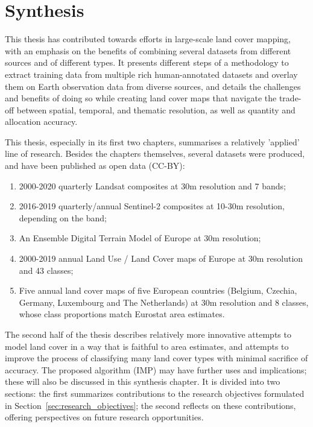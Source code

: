 \chapter[Synthesis]{Synthesis}
\label{cha:Chapter6}
\newpage

This thesis has contributed towards efforts in large-scale land cover mapping, with an emphasis on the benefits of combining several datasets from different sources and of different types. It presents different steps of a methodology to extract training data from multiple rich human-annotated datasets and overlay them on Earth observation data from diverse sources, and details the challenges and benefits of doing so while creating land cover maps that navigate the trade-off between spatial, temporal, and thematic resolution, as well as quantity and allocation accuracy.

This thesis, especially in its first two chapters, summarises a relatively 'applied' line of research. Besides the chapters themselves, several datasets were produced, and have been published as open data (CC-BY):
\begin{enumerate}
    \item 2000-2020 quarterly Landsat composites at 30m resolution and 7 bands;
    \item 2016-2019 quarterly/annual Sentinel-2 composites at 10-30m resolution, depending on the band;
    \item An Ensemble Digital Terrain Model of Europe at 30m resolution;
    \item 2000-2019 annual Land Use / Land Cover maps of Europe at 30m resolution and 43 classes;
    \item Five annual land cover maps of five European countries (Belgium, Czechia, Germany, Luxembourg and The Netherlands) at 30m resolution and 8 classes, whose class proportions match Eurostat area estimates.
\end{enumerate}
The second half of the thesis describes relatively more innovative attempts to model land cover in a way that is faithful to area estimates, and attempts to improve the process of classifying many land cover types with minimal sacrifice of accuracy. The proposed algorithm (IMP) may have further uses and implications; these will also be discussed in this synthesis chapter. It is divided into two sections: the first summarizes contributions to the research objectives formulated in Section~\ref{sec:research_objectives}; the second reflects on these contributions, offering perspectives on future research opportunities. 

